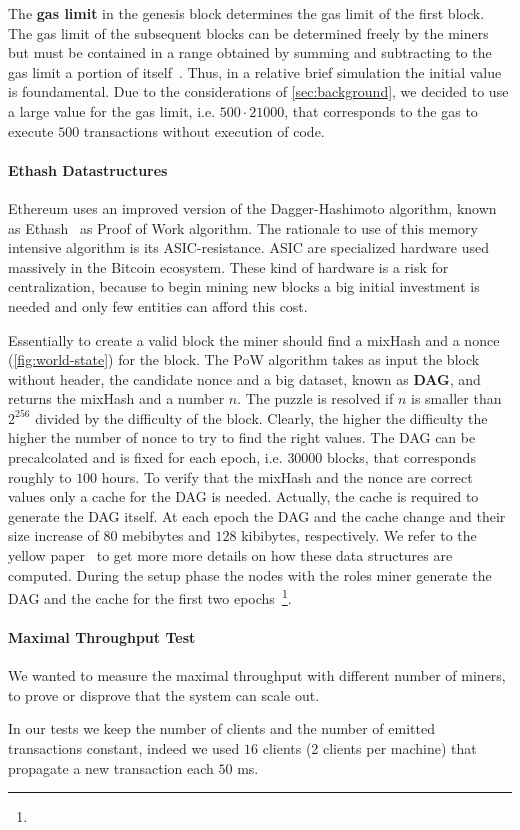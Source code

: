 The \textbf{gas limit} in the genesis block determines the gas limit of the
first block. The gas limit of the subsequent blocks can be determined freely by
the miners but must be contained in a range obtained by summing and subtracting
to the gas limit a portion of itself~\cite{wood2018ethereum}.
Thus, in a relative brief simulation the
initial value is foundamental. Due to the considerations of
\autoref{sec:background}, we decided to use a large value for the gas limit,
i.e. $500 \cdot 21000$, that corresponds to the gas to execute $500$
transactions without execution of code.

\paragraph{Ethash Datastructures} Ethereum uses an improved version of the
Dagger-Hashimoto algorithm, known as 
Ethash~\cite[Appendix J]{wood2018ethereum} as Proof of Work algorithm.
The rationale to use of this memory intensive algorithm is its 
ASIC-resistance. ASIC are specialized hardware used massively in the Bitcoin
ecosystem. These kind of hardware is a risk for centralization, 
because to begin mining new blocks a big initial investment is needed and
only few entities can afford this cost.

Essentially to create a valid block the miner should find a mixHash and
a nonce (\autoref{fig:world-state}) for the block.
The PoW algorithm takes as input the block without header, the candidate
nonce and a big dataset, known as \textbf{DAG}, and
returns the mixHash and a number $n$. The puzzle is resolved if
$n$ is smaller than $2^{256}$ divided by the difficulty of the block. Clearly,
the higher the difficulty the higher the number of nonce to try to find the
right values. The DAG can be precalcolated and is fixed for each epoch, i.e.
$30000$ blocks, that corresponds roughly to $100$ hours. To verify
that the mixHash and the nonce are correct values only a cache for the
DAG is needed. Actually, the cache is required to generate the DAG itself.
At each epoch the DAG and the cache change and their size increase of
$80$ mebibytes and $128$ kibibytes, respectively.
We refer to the yellow paper~\cite[Appendix J]{wood2018ethereum} to get more
more details on how these data structures are computed.
During the setup phase the nodes with the roles miner generate the 
DAG and the cache for the first two epochs~\footnote{}.


\paragraph{Maximal Throughput Test}
We wanted to measure the maximal throughput with different number of miners,
to prove or disprove that the system can scale out.

In our tests we keep the number of clients and the number of emitted 
transactions constant, indeed we used $16$ clients (2 clients per machine) that 
propagate a new  transaction each $50$ ms.